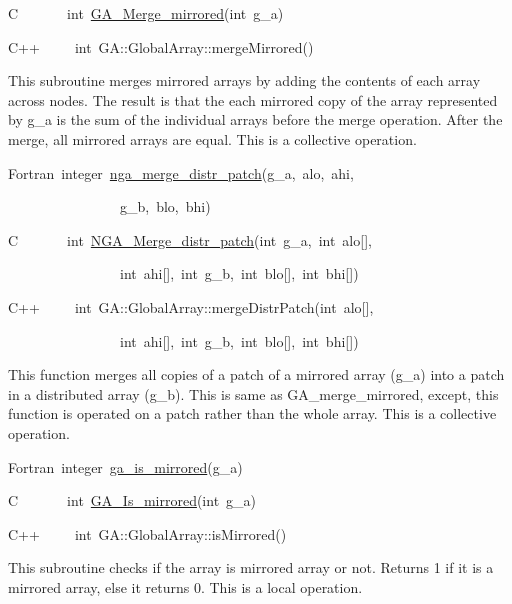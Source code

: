 C~~~~~~~int~\href{https://hpc.pnl.gov/globalarrays/api/c_op_api.html\#GA_MERGE_MIRRORED}{GA\_{}Merge\_{}mirrored}(int~g\_a)~

C++~~~~~int~GA::GlobalArray::mergeMirrored()

This subroutine merges mirrored arrays by adding the contents of each
array across nodes. The result is that the each mirrored copy of the
array represented by g\_a is the sum of the individual arrays before
the merge operation. After the merge, all mirrored arrays are equal.
This is a collective operation.

Fortran~integer~\href{https://hpc.pnl.gov/globalarrays/api/f_op_api.html\#GA_MERGE_DISTR_PATCH}{nga\_{}merge\_{}distr\_{}patch}(g\_a,~alo,~ahi,~

~~~~~~~~~~~~~~~~g\_b,~blo,~bhi)~

C~~~~~~~int~\href{https://hpc.pnl.gov/globalarrays/api/c_op_api.html\#GA_MERGE_DISTR_PATCH}{NGA\_{}Merge\_{}distr\_{}patch}(int~g\_a,~int~alo{[}{]},~

~~~~~~~~~~~~~~~~int~ahi{[}{]},~int~g\_b,~int~blo{[}{]},~int~bhi{[}{]})~

C++~~~~~int~GA::GlobalArray::mergeDistrPatch(int~alo{[}{]},~

~~~~~~~~~~~~~~~~int~ahi{[}{]},~int~g\_b,~int~blo{[}{]},~int~bhi{[}{]})

This function merges all copies of a patch of a mirrored array (g\_a)
into a patch in a distributed array (g\_b). This is same as GA\_merge\_mirrored,
except, this function is operated on a patch rather than the whole
array. This is a collective operation.

Fortran~integer~\href{https://hpc.pnl.gov/globalarrays/api/f_op_api.html\#ga_is_mirrored}{ga\_{}is\_{}mirrored}(g\_a)~

C~~~~~~~int~\href{https://hpc.pnl.gov/globalarrays/api/c_op_api.html\#ga_is_mirrored}{GA\_{}Is\_{}mirrored}(int~g\_a)~

C++~~~~~int~GA::GlobalArray::isMirrored()

This subroutine checks if the array is mirrored array or not. Returns
1 if it is a mirrored array, else it returns 0. This is a local operation. 

